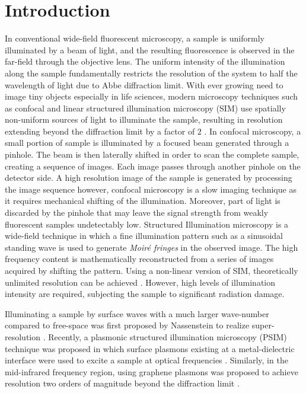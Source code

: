 \documentclass[11pt]{article}
\begin{document}
\section{Introduction}
%
In conventional wide-field fluorescent microscopy, a sample is uniformly illuminated by a beam of light, and the resulting fluorescence is observed in the far-field through the objective lens. The uniform intensity of the illumination along the sample fundamentally restricts the resolution of the system to half the wavelength of light due to Abbe diffraction limit. With ever growing need to image tiny objects especially in life sciences, modern microscopy techniques such as confocal and linear structured illumination microscopy (SIM) use spatially non-uniform sources of light to illuminate the sample, resulting in resolution extending beyond the diffraction limit by a factor of $2$ \cite{Minsky1988,Gustafsson2000}. In confocal microscopy, a small portion of sample is illuminated by a focused beam generated through a pinhole. The beam is then laterally shifted in order to scan the complete sample, creating a sequence of images. Each image passes through another pinhole on the detector side. A high resolution image of the sample is generated by processing the image sequence however, confocal microscopy is a slow imaging technique as it requires mechanical shifting of the illumination. Moreover, part of light is discarded by the pinhole that may leave the signal strength from weakly fluorescent samples undetectably low. Structured Illumination microscopy is a wide-field technique in which a fine illumination pattern such as a sinusoidal standing wave is used to generate \emph{Moiré fringes} in the observed image. The high frequency content is mathematically reconstructed from a series of images acquired by shifting the pattern. Using a non-linear version of SIM, theoretically unlimited resolution can be achieved \cite{Gustafsson_2005}. However, high levels of illumination intensity are required, subjecting the sample to significant radiation damage.

Illuminating a sample by surface waves with a much larger wave-number compared to free-space was first proposed by Nassenstein to realize super-resolution \cite{Nassenstein_1970}. Recently, a plasmonic structured illumination microscopy (PSIM) technique was proposed in which surface plasmons existing at a metal-dielectric interface were used to excite a sample at optical frequencies \cite{Wei_2010}. Similarly, in the mid-infrared frequency region, using graphene plasmons was proposed to achieve resolution two orders of magnitude beyond the diffraction limit \cite{Zeng_2014}.
\end{document}
